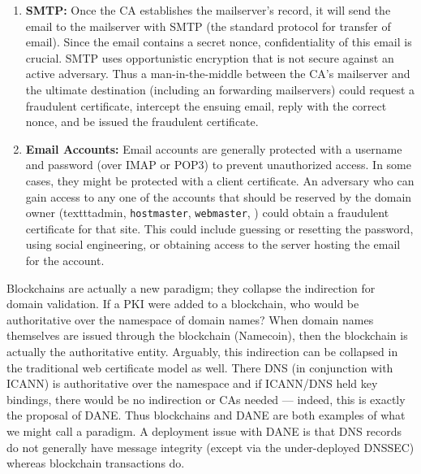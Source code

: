 \begin{enumerate}
\item \textbf{SMTP:} Once the CA establishes the mailserver's record, it will send the email to the mailserver with SMTP (the standard protocol for transfer of email). Since the email contains a secret nonce, confidentiality of this email is crucial. SMTP uses opportunistic encryption that is not secure against an active adversary. Thus a man-in-the-middle between the CA's mailserver and the ultimate destination (including an forwarding mailservers) could request a fraudulent certificate, intercept the ensuing email, reply with the correct nonce, and be issued the fraud\-ulent certificate.

\item \textbf{Email Accounts:} Email accounts are generally protected with a username and password (over IMAP or POP3) to prevent unauthorized access. In some cases, they might be protected with a client certificate. An adversary who can gain access to any one of the accounts that should be reserved by the domain owner (\eg texttt{admin}, \texttt{hostmaster}, \texttt{webmaster}, \etc) could obtain a fraudulent certificate for that site. This could include guessing or resetting the password, using social engineering, or obtaining access to the server hosting the email for the account. 

\end{enumerate}


Blockchains are actually a new paradigm; they collapse the indirection for domain validation. If a PKI were added to a blockchain, who would be authoritative over the namespace of domain names? When domain names themselves are issued through the blockchain (\eg Namecoin), then the blockchain is actually the authoritative entity. Arguably, this indirection can be collapsed in the traditional web certificate model as well. There DNS (in conjunction with ICANN) is authoritative over the namespace and if ICANN/DNS held key bindings, there would be no indirection or CAs needed --- indeed, this is exactly the proposal of DANE. Thus blockchains and DANE are both examples of what we might call a \UA paradigm. A deployment issue with DANE is that DNS records do not generally have message integrity (except via the under-deployed DNSSEC) whereas blockchain transactions do. 


